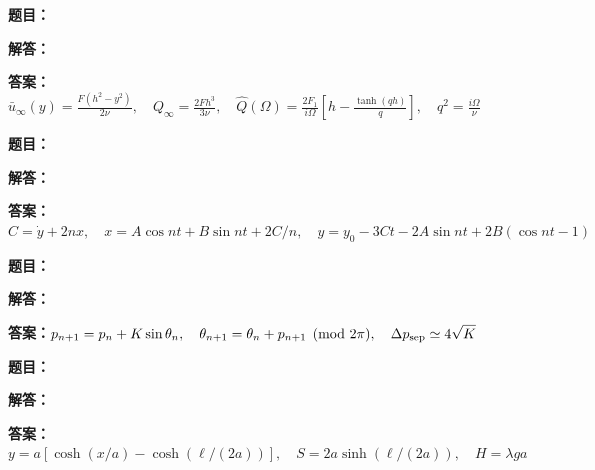 \documentclass[lang=cn,color=blue,11pt]{elegantbook}
\begin{document}
\par
\noindent\textbf{题目：}
\par\noindent\textbf{解答：}
\par\noindent\textbf{答案：}\(\displaystyle \bar u_\infty(y)=\frac{F(h^2-y^2)}{2\nu},\quad Q_\infty=\frac{2Fh^3}{3\nu},\quad \widehat Q(\Omega)=\frac{2F_1}{i\Omega}\left[h-\frac{\tanh(qh)}q\right],\quad q^2=\frac{i\Omega}{\nu}\)\par
\par\smallskip\noindent\hrulefill\par\medskip
{}\par
\noindent\textbf{题目：}
\par\noindent\textbf{解答：}
\par\noindent\textbf{答案：}\(\displaystyle C=\dot y+2nx,\quad x=A\cos nt+B\sin nt+2C/n,\quad y=y_0-3Ct-2A\sin nt+2B(\cos nt-1)\)\par
\par\smallskip\noindent\hrulefill\par\medskip
{}\par
\noindent\textbf{题目：}
\par\noindent\textbf{解答：}
\par\noindent\textbf{答案：}\(\displaystyle p_{n+1}=p_n+K\sin\theta_n,\quad\theta_{n+1}=\theta_n+p_{n+1}\pmod{2\pi},\quad\Delta p_{\rm sep}\simeq4\sqrt K\)\par
\par\smallskip\noindent\hrulefill\par\medskip
{}\par
\noindent\textbf{题目：}
\par\noindent\textbf{解答：}
\par\noindent\textbf{答案：}\(\displaystyle y=a[\cosh(x/a)-\cosh(\ell/(2a))],\quad S=2a\sinh(\ell/(2a)),\quad H=\lambda ga\)\par
\end{document}
